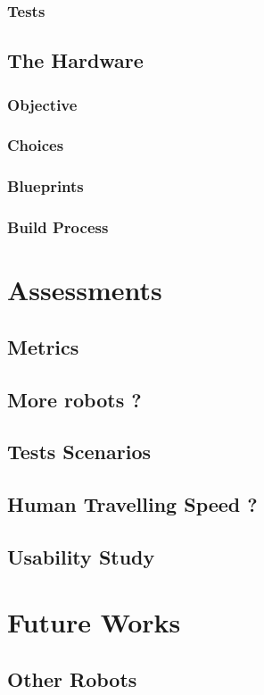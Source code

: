 \documentclass[a4paper, 12pt]{report}
\begin{document}
		\subsection{Tests}

	\section{The Hardware}
		\subsection{Objective}
		\subsection{Choices}
		\subsection{Blueprints}
		\subsection{Build Process}

\chapter{Assessments}
	\section{Metrics}
	\section{More robots ?}
	\section{Tests Scenarios}
	\section{Human Travelling Speed ?}
	\section{Usability Study}

\chapter{Future Works}
	\section{Other Robots}
\end{document}
